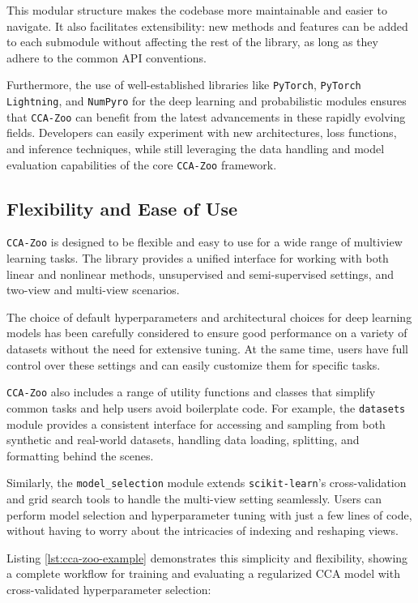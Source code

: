 This modular structure makes the codebase more maintainable and easier to navigate. It also facilitates extensibility: new methods and features can be added to each submodule without affecting the rest of the library, as long as they adhere to the common API conventions.

Furthermore, the use of well-established libraries like \texttt{PyTorch}, \texttt{PyTorch Lightning}, and \texttt{NumPyro} for the deep learning and probabilistic modules ensures that \texttt{CCA-Zoo} can benefit from the latest advancements in these rapidly evolving fields. Developers can easily experiment with new architectures, loss functions, and inference techniques, while still leveraging the data handling and model evaluation capabilities of the core \texttt{CCA-Zoo} framework.

\subsection{Flexibility and Ease of Use}

\texttt{CCA-Zoo} is designed to be flexible and easy to use for a wide range of multiview learning tasks. The library provides a unified interface for working with both linear and nonlinear methods, unsupervised and semi-supervised settings, and two-view and multi-view scenarios.

The choice of default hyperparameters and architectural choices for deep learning models has been carefully considered to ensure good performance on a variety of datasets without the need for extensive tuning. At the same time, users have full control over these settings and can easily customize them for specific tasks.

\texttt{CCA-Zoo} also includes a range of utility functions and classes that simplify common tasks and help users avoid boilerplate code. For example, the \texttt{datasets} module provides a consistent interface for accessing and sampling from both synthetic and real-world datasets, handling data loading, splitting, and formatting behind the scenes.

Similarly, the \texttt{model\_selection} module extends \texttt{scikit-learn}'s cross-validation and grid search tools to handle the multi-view setting seamlessly. Users can perform model selection and hyperparameter tuning with just a few lines of code, without having to worry about the intricacies of indexing and reshaping views.

Listing \ref{lst:cca-zoo-example} demonstrates this simplicity and flexibility, showing a complete workflow for training and evaluating a regularized CCA model with cross-validated hyperparameter selection:

